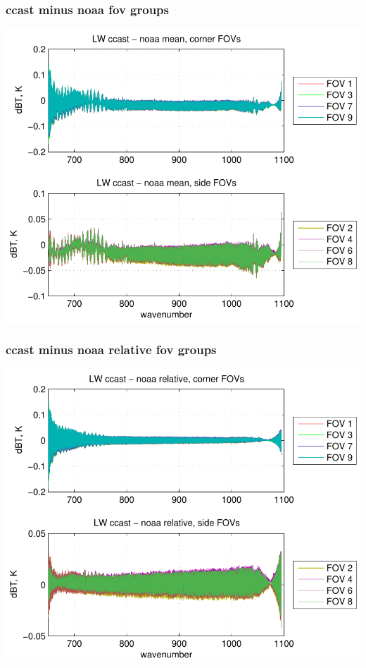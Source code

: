 \documentclass[11pt]{beamer}
\begin{document}
\begin{frame}
\frametitle{ccast minus noaa fov groups}

\begin{center}
  \includegraphics[scale=0.7]{figures/ccast_noaa_LW_fig_2.pdf}
\end{center}

\end{frame}
\begin{frame}
\frametitle{ccast minus noaa relative fov groups}

\begin{center}
  \includegraphics[scale=0.7]{figures/ccast_noaa_LW_fig_3.pdf}
\end{center}

\end{frame}
\end{document}
